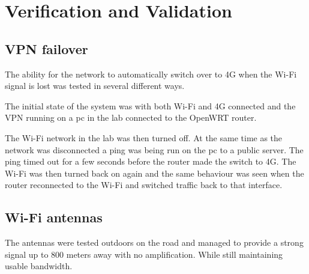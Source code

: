 \section{Verification and Validation}

\subsection{VPN failover}
The ability for the network to automatically switch over to 4G when the Wi-Fi signal is lost was tested in several different ways.

The initial state of the system was with both Wi-Fi and 4G connected and the VPN running on a pc in the lab connected to the OpenWRT router.

The Wi-Fi network in the lab was then turned off. At the same time as the network was disconnected a ping was being run on the pc to a public server. The ping timed out for a few seconds before the router made the switch to 4G. The Wi-Fi was then turned back on again and the same behaviour was seen when the router reconnected to the Wi-Fi and switched traffic back to that interface.

\subsection{Wi-Fi antennas}
The antennas were tested outdoors on the road and managed to provide a strong signal up to 800 meters away with no amplification. While still maintaining usable bandwidth.

